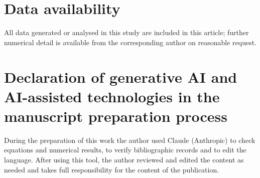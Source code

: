 \documentclass[12pt,a4paper]{article}
\begin{document}







\section*{Data availability}
All data generated or analysed in this study are included in this article; further numerical detail is available from the corresponding author on reasonable request.

\section*{Declaration of generative AI and AI-assisted technologies in the manuscript preparation process}
During the preparation of this work the author used Claude (Anthropic) to check
equations and numerical results, to verify
bibliographic records and to edit the language. After using this tool, the author
reviewed and edited the content as needed and takes full responsibility for the
content of the publication.

\appendix





\end{document}
